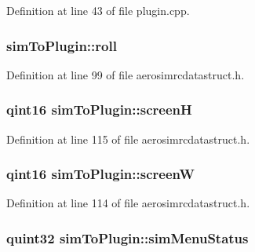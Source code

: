Definition at line 43 of file plugin.\-cpp.

\hypertarget{group___aero_sim_r_c_ga5ae77c3d47014ab64ef930314843a0fe}{
\subsubsection[{roll}]{ sim\-To\-Plugin\-::roll}}\label{group___aero_sim_r_c_ga5ae77c3d47014ab64ef930314843a0fe}


Definition at line 99 of file aerosimrcdatastruct.\-h.

\hypertarget{group___aero_sim_r_c_gaf9235fc17924379e9bdd0826d1111e2c}{
\subsubsection[{screen\-H}]{\setlength{\rightskip}{0pt plus 5cm}qint16 sim\-To\-Plugin\-::screen\-H}}\label{group___aero_sim_r_c_gaf9235fc17924379e9bdd0826d1111e2c}


Definition at line 115 of file aerosimrcdatastruct.\-h.

\hypertarget{group___aero_sim_r_c_ga0e82f7a599641d119734afe4a0f4403c}{
\subsubsection[{screen\-W}]{\setlength{\rightskip}{0pt plus 5cm}qint16 sim\-To\-Plugin\-::screen\-W}}\label{group___aero_sim_r_c_ga0e82f7a599641d119734afe4a0f4403c}


Definition at line 114 of file aerosimrcdatastruct.\-h.

\hypertarget{group___aero_sim_r_c_ga1cc3af651b3f3382357e9a882abc64d4}{
\subsubsection[{sim\-Menu\-Status}]{\setlength{\rightskip}{0pt plus 5cm}quint32 sim\-To\-Plugin\-::sim\-Menu\-Status}}\label{group___aero_sim_r_c_ga1cc3af651b3f3382357e9a882abc64d4}


